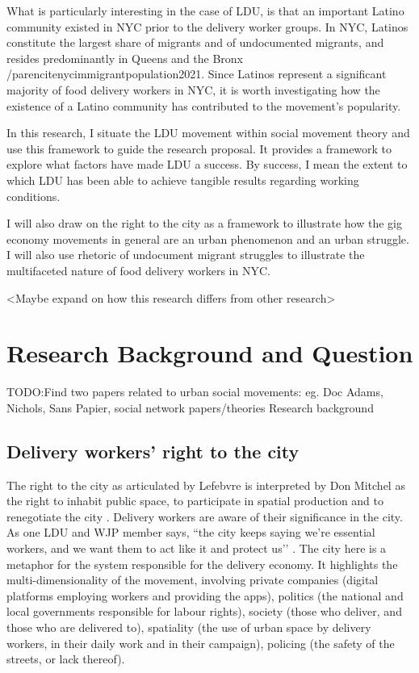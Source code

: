 \documentclass{article}
\begin{document}
What is particularly interesting in the case of LDU, is that an important Latino community existed in NYC prior to the delivery worker groups. In NYC, Latinos constitute the largest share of migrants and of undocumented migrants, and resides predominantly in Queens and the Bronx /parencite{nycimmigrantpopulation2021}. Since Latinos represent a significant majority of food delivery workers in NYC, it is worth investigating how the existence of a Latino community has contributed to the movement’s popularity.

In this research, I situate the LDU movement within social movement theory and use this framework to guide the research proposal. It provides a framework to explore what factors have made LDU a success. By success, I mean the extent to which LDU has been able to achieve tangible results regarding working conditions.

I will also draw on the right to the city as a framework to illustrate how the gig economy movements in general are an urban phenomenon and an urban struggle. I will also use rhetoric of undocument migrant struggles to illustrate the multifaceted nature of food delivery workers in NYC.

<Maybe expand on how this research differs from other research>

\section{Research Background and Question}

TODO:Find two papers related to urban social movements: eg. Doc Adams, Nichols, Sans Papier, social network papers/theories
Research background

\subsection{Delivery workers’ right to the city}

The right to the city as articulated by Lefebvre \cite{lefebvre1995writings} is interpreted by Don Mitchel \cite{mitchell2003right} as the right to inhabit public space, to participate in spatial production and to renegotiate the city \parencite{lee2018delivering}. Delivery workers are aware of their significance in the city. As one LDU and WJP member says, ``the city keeps saying we’re essential workers, and we want them to act like it and protect us’’ \cite{ldutestimonials}. The city here is a metaphor for the system responsible for the delivery economy. It highlights the multi-dimensionality of the movement, involving private companies (digital platforms employing workers and providing the apps), politics (the national and local governments responsible for labour rights), society (those who deliver, and those who are delivered to), spatiality (the use of urban space by delivery workers, in their daily work and in their campaign), policing (the safety of the streets, or lack thereof).
\end{document}

